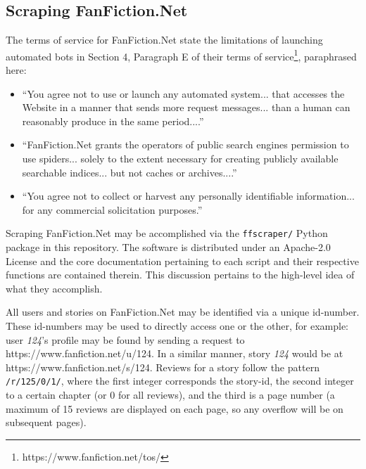 \documentclass[letterpaper]{article}
\begin{document}
\subsection{Scraping FanFiction.Net}

The terms of service for FanFiction.Net state the limitations of launching automated bots in Section 4, Paragraph E of their terms of service\footnote{https://www.fanfiction.net/tos/}, paraphrased here:

\begin{itemize}
    \item ``You agree not to use or launch any automated system... that accesses the Website in a manner that sends more request messages... than a human can reasonably produce in the same period....''
    \item ``FanFiction.Net grants the operators of public search engines permission to use spiders... solely to the extent necessary for creating publicly available searchable indices... but not caches or archives....''
    \item ``You agree not to collect or harvest any personally identifiable information... for any commercial solicitation purposes.''
\end{itemize}

Scraping FanFiction.Net may be accomplished via the \texttt{ffscraper/} Python package in this repository. The software is distributed under an Apache-2.0 License and the core documentation pertaining to each script and their respective functions are contained therein.  This discussion pertains to the high-level idea of what they accomplish.

All users and stories on FanFiction.Net may be identified via a unique id-number. These id-numbers may be used to directly access one or the other, for example: user \textit{124}'s profile may be found by sending a request to https://www.fanfiction.net/u/124. In a similar manner, story \textit{124} would be at https://www.fanfiction.net/s/124. Reviews for a story follow the pattern \texttt{/r/125/0/1/}, where the first integer corresponds the story-id, the second integer to a certain chapter (or 0 for all reviews), and the third is a page number (a maximum of 15 reviews are displayed on each page, so any overflow will be on subsequent pages).



\end{document}
